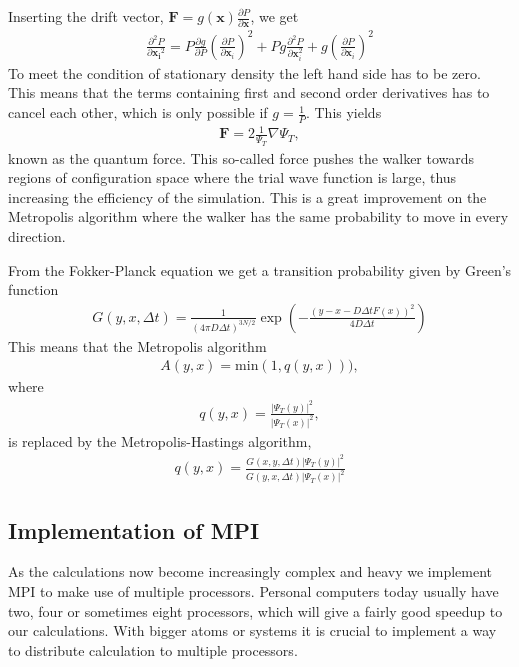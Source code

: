 		Inserting the drift vector, $\mathbf{F}=g(\mathbf{x})\frac{\partial P}{\partial\mathbf{x}}$,
		we get
		\begin{align}
			\frac{\partial^{2}P}{\partial{\mathbf{x_{i}}^{2}}}=P\frac{\partial g}{\partial P}\left(\frac{\partial P}{\partial{\mathbf{x}_{i}}}\right)^{2}+Pg\frac{\partial^{2}P}{\partial{\mathbf{x}_{i}^{2}}}+g\left(\frac{\partial P}{\partial{\mathbf{x}_{i}}}\right)^{2}
		\end{align}
		To meet the condition of stationary density the left hand side has
		to be zero. This means that the terms containing first and second
		order derivatives has to cancel each other, which is only possible
		if $g=\frac{1}{P}$. This yields
		\begin{align}
			\mathbf{F}=2\frac{1}{\Psi_{T}}\nabla\Psi_{T},
		\end{align}
		known as the quantum force. This so-called force pushes the walker
		towards regions of configuration space where the trial wave function
		is large, thus increasing the efficiency of the simulation. This is
		a great improvement on the Metropolis algorithm where the walker has
		the same probability to move in every direction.

		From the Fokker-Planck equation we get a transition probability given
		by Green's function
		\begin{align}
			G(y,x,\Delta t)=\frac{1}{(4\pi D\Delta t)^{3N/2}}\exp\left(-\frac{(y-x-D\Delta tF(x))^{2}}{4D\Delta t}\right)
		\end{align}
		This means that the Metropolis algorithm
		\begin{align}
			A(y,x)=\mathrm{min}(1,q(y,x))),
		\end{align}
		where
		\begin{align}
			q(y,x)=\frac{|\Psi_{T}(y)|^{2}}{|\Psi_{T}(x)|^{2}},
		\end{align}
		is replaced by the Metropolis-Hastings algorithm,
		\begin{align}
			q(y,x)=\frac{G(x,y,\Delta t)|\Psi_{T}(y)|^{2}}{G(y,x,\Delta t)|\Psi_{T}(x)|^{2}}
		\end{align}


\subsection{Implementation of MPI}
		As the calculations now become increasingly complex and heavy we implement MPI to make use of multiple processors. Personal computers today usually have two, four or sometimes eight processors, which will give a fairly good speedup to our calculations. With bigger atoms or systems it is crucial to implement a way to distribute calculation to multiple processors.

